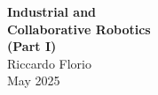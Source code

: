 \documentclass[12pt]{article}
\begin{document}
\thispagestyle{empty} %
\vspace*{\fill}
\begin{center}
  {\LARGE \textbf{Industrial and\\ Collaborative Robotics\\[0.5em] (Part I)}}\\[1.5em]
  {\large Riccardo Florio}\\[0.5em]
  {\large May 2025}
\end{center}
\vspace*{\fill}
\newpage

\thispagestyle{empty}
\mbox{}
\newpage

\tableofcontents
\newpage

\setcounter{page}{1}








\end{document}
